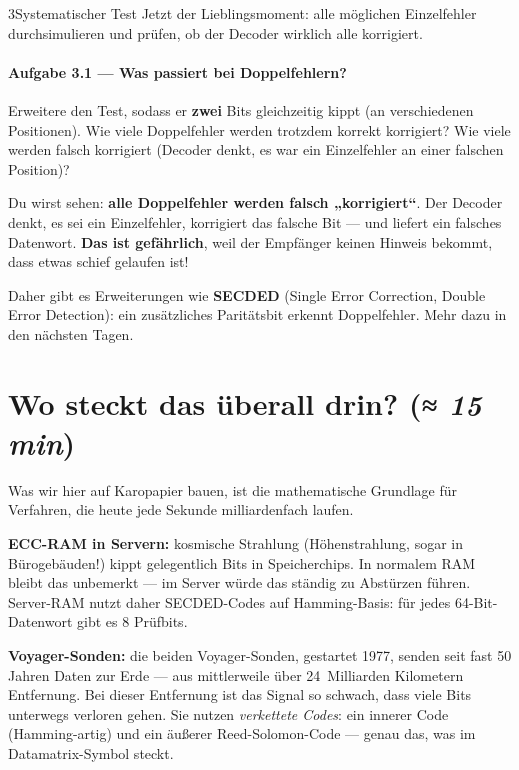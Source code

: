 \begin{pythoneinheit}{3}{Systematischer Test}
Jetzt der Lieblingsmoment: alle möglichen Einzelfehler durchsimulieren
und prüfen, ob der Decoder wirklich alle korrigiert.


\paragraph{Aufgabe 3.1 — Was passiert bei Doppelfehlern?}
Erweitere den Test, sodass er \textbf{zwei} Bits gleichzeitig kippt
(an verschiedenen Positionen). Wie viele Doppelfehler werden trotzdem
korrekt korrigiert? Wie viele werden falsch korrigiert (Decoder denkt,
es war ein Einzelfehler an einer falschen Position)?


Du wirst sehen: \textbf{alle Doppelfehler werden falsch „korrigiert“}.
Der Decoder denkt, es sei ein Einzelfehler, korrigiert das falsche Bit
— und liefert ein falsches Datenwort. \textbf{Das ist gefährlich}, weil
der Empfänger keinen Hinweis bekommt, dass etwas schief gelaufen ist!

Daher gibt es Erweiterungen wie \textbf{SECDED} (Single Error
Correction, Double Error Detection): ein zusätzliches Paritätsbit
erkennt Doppelfehler. Mehr dazu in den nächsten Tagen.
\end{pythoneinheit}

\section{Wo steckt das überall drin? \normalfont(\textit{≈ 15 min})}

Was wir hier auf Karopapier bauen, ist die mathematische Grundlage für
Verfahren, die heute jede Sekunde milliardenfach laufen.

\textbf{ECC-RAM in Servern:} kosmische Strahlung (Höhenstrahlung, sogar
in Bürogebäuden!) kippt gelegentlich Bits in Speicherchips. In normalem
RAM bleibt das unbemerkt — im Server würde das ständig zu Abstürzen
führen. Server-RAM nutzt daher SECDED-Codes auf Hamming-Basis: für
jedes 64-Bit-Datenwort gibt es 8 Prüfbits.

\textbf{Voyager-Sonden:} die beiden Voyager-Sonden, gestartet 1977,
senden seit fast 50 Jahren Daten zur Erde — aus mittlerweile über
24~Milliarden Kilometern Entfernung. Bei dieser Entfernung ist das
Signal so schwach, dass viele Bits unterwegs verloren gehen. Sie
nutzen \emph{verkettete Codes}: ein innerer Code (Hamming-artig) und
ein äußerer Reed-Solomon-Code — genau das, was im Datamatrix-Symbol
steckt.

